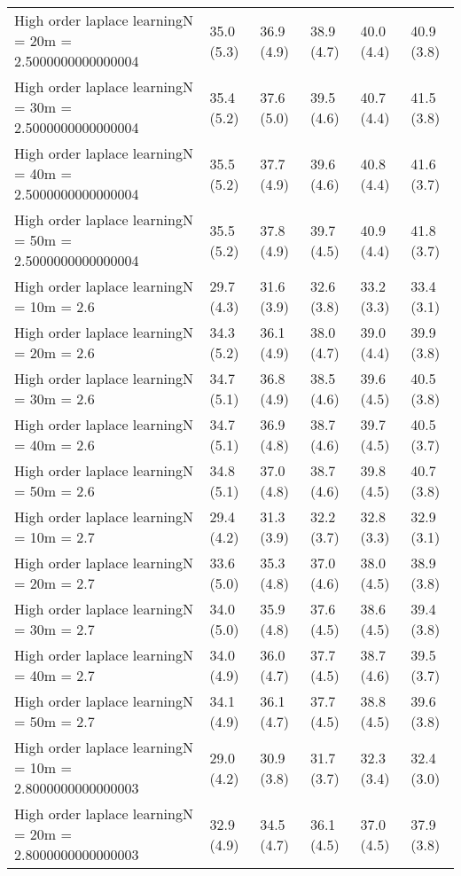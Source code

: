 \documentclass{article}
\begin{document}
\begin{table*}[t!]
\begin{center}
\begin{small}
\begin{sc}
\begin{tabular}{llllll}
High order laplace learningN = 20m = 2.5000000000000004&35.0 (5.3)      &36.9 (4.9)      &38.9 (4.7)      &40.0 (4.4)      &40.9 (3.8)      \\
High order laplace learningN = 30m = 2.5000000000000004&35.4 (5.2)      &37.6 (5.0)      &39.5 (4.6)      &40.7 (4.4)      &41.5 (3.8)      \\
High order laplace learningN = 40m = 2.5000000000000004&35.5 (5.2)      &37.7 (4.9)      &39.6 (4.6)      &40.8 (4.4)      &41.6 (3.7)      \\
High order laplace learningN = 50m = 2.5000000000000004&35.5 (5.2)      &37.8 (4.9)      &39.7 (4.5)      &40.9 (4.4)      &41.8 (3.7)      \\
High order laplace learningN = 10m = 2.6&29.7 (4.3)      &31.6 (3.9)      &32.6 (3.8)      &33.2 (3.3)      &33.4 (3.1)      \\
High order laplace learningN = 20m = 2.6&34.3 (5.2)      &36.1 (4.9)      &38.0 (4.7)      &39.0 (4.4)      &39.9 (3.8)      \\
High order laplace learningN = 30m = 2.6&34.7 (5.1)      &36.8 (4.9)      &38.5 (4.6)      &39.6 (4.5)      &40.5 (3.8)      \\
High order laplace learningN = 40m = 2.6&34.7 (5.1)      &36.9 (4.8)      &38.7 (4.6)      &39.7 (4.5)      &40.5 (3.7)      \\
High order laplace learningN = 50m = 2.6&34.8 (5.1)      &37.0 (4.8)      &38.7 (4.6)      &39.8 (4.5)      &40.7 (3.8)      \\
High order laplace learningN = 10m = 2.7&29.4 (4.2)      &31.3 (3.9)      &32.2 (3.7)      &32.8 (3.3)      &32.9 (3.1)      \\
High order laplace learningN = 20m = 2.7&33.6 (5.0)      &35.3 (4.8)      &37.0 (4.6)      &38.0 (4.5)      &38.9 (3.8)      \\
High order laplace learningN = 30m = 2.7&34.0 (5.0)      &35.9 (4.8)      &37.6 (4.5)      &38.6 (4.5)      &39.4 (3.8)      \\
High order laplace learningN = 40m = 2.7&34.0 (4.9)      &36.0 (4.7)      &37.7 (4.5)      &38.7 (4.6)      &39.5 (3.7)      \\
High order laplace learningN = 50m = 2.7&34.1 (4.9)      &36.1 (4.7)      &37.7 (4.5)      &38.8 (4.5)      &39.6 (3.8)      \\
High order laplace learningN = 10m = 2.8000000000000003&29.0 (4.2)      &30.9 (3.8)      &31.7 (3.7)      &32.3 (3.4)      &32.4 (3.0)      \\
High order laplace learningN = 20m = 2.8000000000000003&32.9 (4.9)      &34.5 (4.7)      &36.1 (4.5)      &37.0 (4.5)      &37.9 (3.8)      \\

\end{tabular}
\end{sc}
\end{small}
\end{center}
\end{table*}
\end{document}
